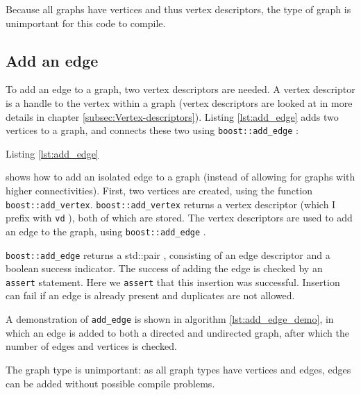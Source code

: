 Because all graphs have vertices and thus vertex descriptors, the type of
graph is unimportant for this code to compile.

\subsection{Add an edge}
\label{subsec:add_edge}

To add an edge to a graph, two vertex descriptors are needed.
A vertex descriptor 
is a handle to the vertex within a graph (vertex descriptors are looked
 at in more details in chapter 
\ref{subsec:Vertex-descriptors}).
Listing \ref{lst:add_edge}
adds two vertices to a graph, and connects these two using 
\verb;boost::add_edge; : 



Listing \ref{lst:add_edge}

shows how to add an isolated edge to a graph (instead of allowing for graphs
with higher connectivities).
First, two vertices are created, using the function \verb;boost::add_vertex;.
\verb;boost::add_vertex; returns a vertex descriptor 
(which I prefix with \verb;vd; ), 
both of which are stored.
The vertex descriptors are used to add an edge to the graph, 
using 
\verb;boost::add_edge; .

\verb;boost::add_edge; 
returns a std::pair , 
consisting of an edge descriptor and a boolean success indicator.
The success of adding the edge is checked by an \verb;assert; statement.
Here we \verb;assert; 
that this insertion was successful.
Insertion can fail if an edge is already present and duplicates are not
allowed.

A demonstration of \verb;add_edge; is shown in algorithm 
\ref{lst:add_edge_demo}, 
in which an edge is added to both a directed and undirected graph, 
after which the number of edges and vertices is checked.



The graph type is unimportant: as all graph types have vertices and edges,
 edges can be added without possible compile problems.

